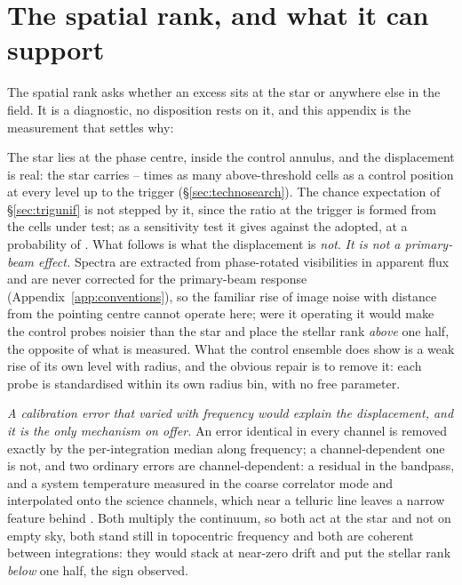 \section{The spatial rank, and what it can support}
\label{app:radius}

The spatial rank asks whether an excess sits at the star or anywhere else in
the field. It is a diagnostic, no disposition rests on it, and this appendix
is the measurement that settles why: \rankstatus{}

The star lies at the phase centre, inside the control annulus, and the
displacement is real: the star carries \CkRatioLo--\CkRatioHi{} times as many
above-threshold cells as a control position at every level up to the trigger
(\S\ref{sec:technosearch}). The chance expectation of \S\ref{sec:trigunif} is
not stepped by it, since the ratio at the trigger is formed from the cells
under test; as a sensitivity test it gives \CeExpX{} against the \CeExp{}
adopted, at a probability of \CeProbStep. What follows is what the displacement is \emph{not}.
\emph{It is not a primary-beam effect.} Spectra are
extracted from phase-rotated visibilities in apparent flux and are never
corrected for the primary-beam response (Appendix~\ref{app:conventions}), so
the familiar rise of image noise with distance from the pointing centre
cannot operate here; were it operating it would make the control probes
noisier than the star and place the stellar rank \emph{above} one half, the
opposite of what is measured. What the control ensemble does show is a weak
rise of its own level with radius, and the obvious repair is to remove it:
each probe is standardised within its own radius bin, with no free parameter.

\emph{A calibration error that varied with frequency would explain the
displacement, and it is the only mechanism on offer.} An error identical in
every channel is removed exactly by the per-integration median along
frequency; a channel-dependent one is not, and two ordinary errors are
channel-dependent: a residual in the bandpass, and a system temperature
measured in the coarse correlator mode and interpolated onto the science
channels, which near a telluric line leaves a narrow feature behind
\citep{ALMATsys2018}. Both
multiply the continuum, so both act at the star and not on empty sky, both
stand still in topocentric frequency and both are coherent between
integrations: they would stack at near-zero drift and put the stellar rank
\emph{below} one half, the sign observed.

